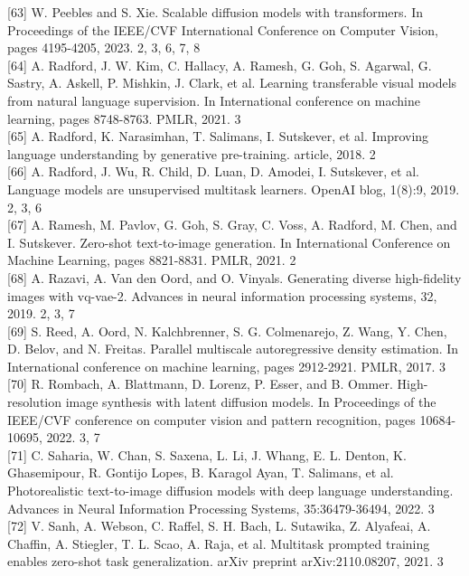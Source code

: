 \documentclass{article}
\begin{document}
[63] W. Peebles and S. Xie. Scalable diffusion models with transformers. In Proceedings of the IEEE/CVF International Conference on Computer Vision, pages 4195-4205, 2023. 2, 3, 6, 7, 8\\[0pt]
[64] A. Radford, J. W. Kim, C. Hallacy, A. Ramesh, G. Goh, S. Agarwal, G. Sastry, A. Askell, P. Mishkin, J. Clark, et al. Learning transferable visual models from natural language supervision. In International conference on machine learning, pages 8748-8763. PMLR, 2021. 3\\[0pt]
[65] A. Radford, K. Narasimhan, T. Salimans, I. Sutskever, et al. Improving language understanding by generative pre-training. article, 2018. 2\\[0pt]
[66] A. Radford, J. Wu, R. Child, D. Luan, D. Amodei, I. Sutskever, et al. Language models are unsupervised multitask learners. OpenAI blog, 1(8):9, 2019. 2, 3, 6\\[0pt]
[67] A. Ramesh, M. Pavlov, G. Goh, S. Gray, C. Voss, A. Radford, M. Chen, and I. Sutskever. Zero-shot text-to-image generation. In International Conference on Machine Learning, pages 8821-8831. PMLR, 2021. 2\\[0pt]
[68] A. Razavi, A. Van den Oord, and O. Vinyals. Generating diverse high-fidelity images with vq-vae-2. Advances in neural information processing systems, 32, 2019. 2, 3, 7\\[0pt]
[69] S. Reed, A. Oord, N. Kalchbrenner, S. G. Colmenarejo, Z. Wang, Y. Chen, D. Belov, and N. Freitas. Parallel multiscale autoregressive density estimation. In International conference on machine learning, pages 2912-2921. PMLR, 2017. 3\\[0pt]
[70] R. Rombach, A. Blattmann, D. Lorenz, P. Esser, and B. Ommer. High-resolution image synthesis with latent diffusion models. In Proceedings of the IEEE/CVF conference on computer vision and pattern recognition, pages 10684-10695, 2022. 3, 7\\[0pt]
[71] C. Saharia, W. Chan, S. Saxena, L. Li, J. Whang, E. L. Denton, K. Ghasemipour, R. Gontijo Lopes, B. Karagol Ayan, T. Salimans, et al. Photorealistic text-to-image diffusion models with deep language understanding. Advances in Neural Information Processing Systems, 35:36479-36494, 2022. 3\\[0pt]
[72] V. Sanh, A. Webson, C. Raffel, S. H. Bach, L. Sutawika, Z. Alyafeai, A. Chaffin, A. Stiegler, T. L. Scao, A. Raja, et al. Multitask prompted training enables zero-shot task generalization. arXiv preprint arXiv:2110.08207, 2021. 3\\[0pt]
\end{document}
